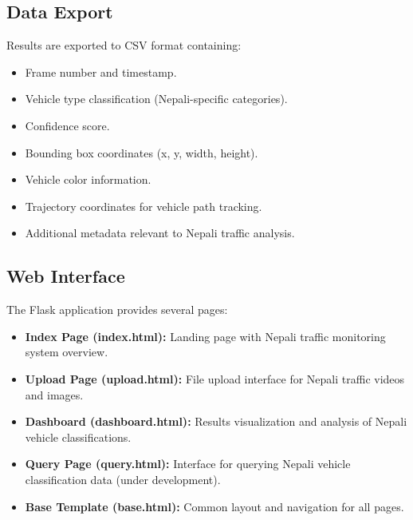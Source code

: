 \documentclass[12pt,a4paper]{report}
\begin{document}
\subsection{Data Export}
Results are exported to CSV format containing:
\begin{itemize}
    \item Frame number and timestamp.
    \item Vehicle type classification (Nepali-specific categories).
    \item Confidence score.
    \item Bounding box coordinates (x, y, width, height).
    \item Vehicle color information.
    \item Trajectory coordinates for vehicle path tracking.
    \item Additional metadata relevant to Nepali traffic analysis.
\end{itemize}

\subsection{Web Interface}
The Flask application provides several pages:
\begin{itemize}
    \item \textbf{Index Page (index.html):} Landing page with Nepali traffic monitoring system overview.
    \item \textbf{Upload Page (upload.html):} File upload interface for Nepali traffic videos and images.
    \item \textbf{Dashboard (dashboard.html):} Results visualization and analysis of Nepali vehicle classifications.
    \item \textbf{Query Page (query.html):} Interface for querying Nepali vehicle classification data (under development).
    \item \textbf{Base Template (base.html):} Common layout and navigation for all pages.
\end{itemize}
\end{document}
